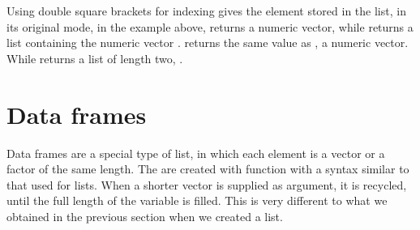 \documentclass[paper=a4,10pt,div=17,headsepline,BCOR=12mm,twoside,open=right]{scrbook}\usepackage{knitr}
\begin{document}
Using double square brackets for indexing gives the element stored in the list, in its original mode, in the example above,  returns a numeric vector, while  returns a list containing the numeric vector .  returns the same value as , a numeric vector. While  returns a list of length two, .

\section{Data frames}

Data frames are a special type of list, in which each element is a vector or a factor of the same length. The are created with function  with a syntax similar to that used for lists. When a shorter vector is supplied as argument, it is recycled, until the full length of the variable is filled. This is very different to what we obtained in the previous section when we created a list.
\end{document}
